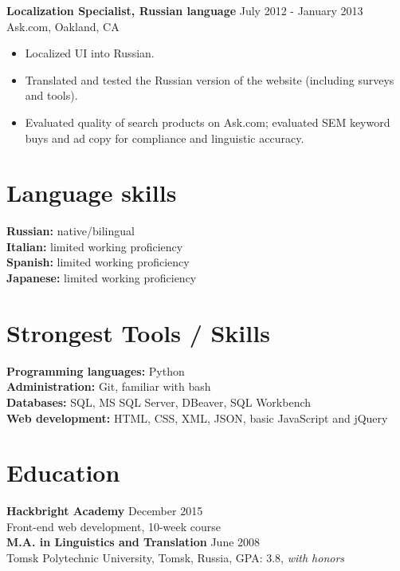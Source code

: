 \documentclass[10pt,line,letterpaper]{res}
\begin{document}
\begin{resume}
    {\bf Localization Specialist, Russian language} \hfill July 2012 - January 2013 \\
    Ask.com, Oakland, CA
    \begin{itemize} \itemsep -2pt
    \item Localized UI into Russian.
    \item Translated and tested the Russian version of the website (including surveys and tools).
    \item Evaluated quality of search products on Ask.com; evaluated SEM keyword buys and ad copy for compliance and linguistic accuracy.

    \end{itemize}

\section {Language skills}
    {\bf Russian:} native/bilingual \\
    {\bf Italian:} limited working proficiency \\
    {\bf Spanish:} limited working proficiency \\
    {\bf Japanese:} limited working proficiency \\

\section{Strongest Tools / Skills}
    {\bf Programming languages:} Python \\
    {\bf Administration:} Git, familiar with bash \\
    {\bf Databases:}  SQL, MS SQL Server, DBeaver, SQL Workbench\\
    {\bf Web development:} HTML, CSS, XML, JSON, basic JavaScript and jQuery \\

\section{Education}
    {\bf Hackbright Academy} \hfill December 2015 \\ Front-end web development, 10-week course \\
    {\bf M.A. in Linguistics and Translation} \hfill June 2008 \\Tomsk Polytechnic University, Tomsk, Russia, GPA: 3.8, \textit{with honors}

\end{resume}
\end{document}
